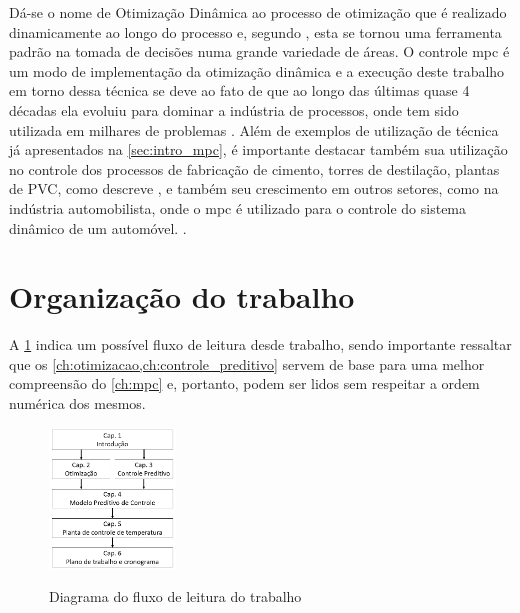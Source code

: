 Dá-se o nome de Otimização Dinâmica ao processo de otimização que é realizado
dinamicamente ao longo do processo e, segundo , esta se
tornou uma ferramenta padrão na tomada de decisões numa grande variedade de áreas.
O controle \acrshort{mpc} é um modo de implementação da otimização dinâmica e a execução
deste trabalho em torno dessa técnica se deve ao fato de que ao longo das últimas quase 4
décadas \cite{Lee2011} ela evoluiu para dominar a indústria de processos, onde tem sido
utilizada em milhares de problemas \cite{Borrelli2017}.
Além de exemplos de utilização de técnica já apresentados na \cref{sec:intro_mpc}, é
importante destacar também sua utilização no controle dos processos de fabricação de cimento,
torres de destilação, plantas de PVC, como descreve , e também 
seu crescimento em outros setores, como na indústria automobilista, onde o \acrshort{mpc}
é utilizado para o controle do sistema dinâmico de um automóvel. \cite{Yakub2013}.

\section{Organização do trabalho}
\label{sec:organizacao_do_trabalho}


A \cref{fig:estrutura_do_trabalho} indica um possível fluxo de leitura desde trabalho, sendo importante
ressaltar que os \cref{ch:otimizacao,ch:controle_preditivo} servem de base para uma melhor
compreensão do \cref{ch:mpc} e, portanto, podem ser lidos sem respeitar a ordem numérica dos mesmos.

\begin{figure}[h]
    \caption{Diagrama do fluxo de leitura do trabalho}
    \begin{center}
		\includegraphics[width=0.3\textwidth]{./5_images/fig_estrutura_do_trabalho.png} 
		\label{fig:estrutura_do_trabalho}
    \end{center}
    \centering
\end{figure}